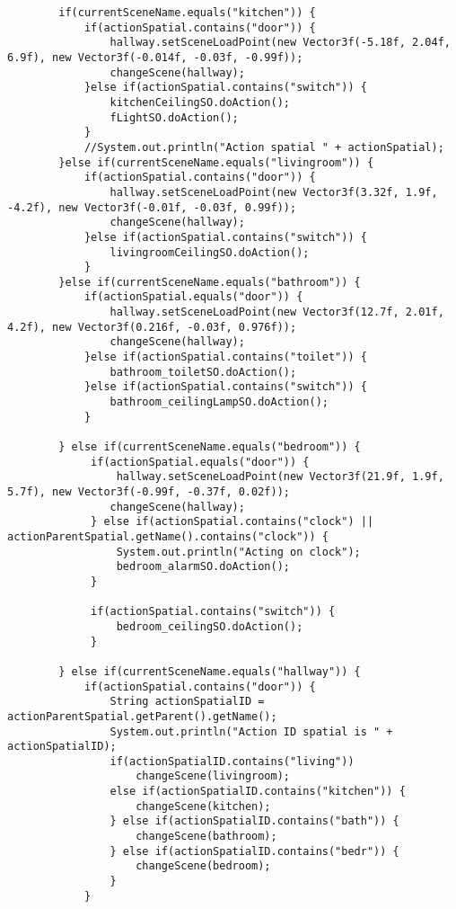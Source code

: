 \begin{lstlisting}
        if(currentSceneName.equals("kitchen")) {
            if(actionSpatial.contains("door")) {
                hallway.setSceneLoadPoint(new Vector3f(-5.18f, 2.04f, 6.9f), new Vector3f(-0.014f, -0.03f, -0.99f));
                changeScene(hallway);
            }else if(actionSpatial.contains("switch")) {
                kitchenCeilingSO.doAction();
                fLightSO.doAction();
            }
            //System.out.println("Action spatial " + actionSpatial);
        }else if(currentSceneName.equals("livingroom")) {
            if(actionSpatial.contains("door")) {
                hallway.setSceneLoadPoint(new Vector3f(3.32f, 1.9f, -4.2f), new Vector3f(-0.01f, -0.03f, 0.99f));
                changeScene(hallway);
            }else if(actionSpatial.contains("switch")) {
                livingroomCeilingSO.doAction();
            }
        }else if(currentSceneName.equals("bathroom")) {
            if(actionSpatial.equals("door")) {
                hallway.setSceneLoadPoint(new Vector3f(12.7f, 2.01f, 4.2f), new Vector3f(0.216f, -0.03f, 0.976f));
                changeScene(hallway);
            }else if(actionSpatial.contains("toilet")) {
                bathroom_toiletSO.doAction();
            }else if(actionSpatial.contains("switch")) {
                bathroom_ceilingLampSO.doAction();
            }
            
        } else if(currentSceneName.equals("bedroom")) {
             if(actionSpatial.equals("door")) {
                 hallway.setSceneLoadPoint(new Vector3f(21.9f, 1.9f, 5.7f), new Vector3f(-0.99f, -0.37f, 0.02f));
                changeScene(hallway);             
             } else if(actionSpatial.contains("clock") || actionParentSpatial.getName().contains("clock")) {
                 System.out.println("Acting on clock");
                 bedroom_alarmSO.doAction();               
             } 
             
             if(actionSpatial.contains("switch")) {
                 bedroom_ceilingSO.doAction();
             }
             
        } else if(currentSceneName.equals("hallway")) {
            if(actionSpatial.contains("door")) {
                String actionSpatialID = actionParentSpatial.getParent().getName(); 
                System.out.println("Action ID spatial is " + actionSpatialID);
                if(actionSpatialID.contains("living")) 
                    changeScene(livingroom);
                else if(actionSpatialID.contains("kitchen")) {
                    changeScene(kitchen);
                } else if(actionSpatialID.contains("bath")) {
                    changeScene(bathroom);
                } else if(actionSpatialID.contains("bedr")) {
                    changeScene(bedroom);
                }
            }
            

\end{lstlisting}
